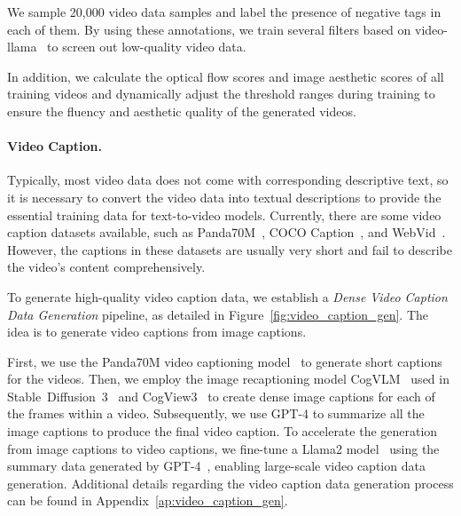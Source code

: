 We sample 20,000 video data samples and label the presence of negative tags in each of them. 
By using these annotations, we train several filters based on video-llama~\citep{zhang2023video}  to screen out low-quality video data. 


In addition, we calculate the optical flow scores and image aesthetic scores of all training videos and dynamically adjust the threshold ranges during training  to ensure the fluency and aesthetic quality of the generated videos. 




\paragraph{Video Caption.} 
Typically, most video data does not come with corresponding descriptive text, so it is necessary to convert the video data into textual descriptions to provide the essential training data for text-to-video models. 
Currently, there are some video caption datasets available, such as Panda70M~\citep{chen2024panda}, COCO Caption~\citep{lin2014microsoft}, and WebVid~\cite{bain2021frozen}. 
However, the captions in these datasets are usually very short and fail to describe the video's content comprehensively. 






To generate high-quality video caption data, we establish a \textit{Dense Video Caption Data Generation} 
pipeline, as detailed in Figure~\ref{fig:video_caption_gen}.  
The idea is to generate video captions from image captions. %

First, we use the Panda70M video captioning model~\citep{chen2024panda} to generate short captions for the videos. 
Then, we employ the image recaptioning model CogVLM~\citep{wang2023cogvlm} used in Stable~Diffusion~3~\citep{esser2024scaling} and CogView3~\citep{zheng2024cogview3} to create dense image captions for each of the frames within a video.  
Subsequently, we use GPT-4 to summarize all the image captions to produce the final video caption. 
To accelerate the generation from image captions to video captions, we fine-tune a Llama2 model~\citep{touvron2023llama} using the summary data generated by GPT-4~\citep{GPT4}, enabling large-scale video caption data generation. Additional details regarding the video caption data generation process can be found in Appendix~\ref{ap:video_caption_gen}.


